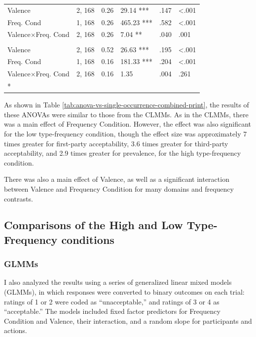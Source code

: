 \documentclass[
]{article}
\begin{document}
\begin{longtable}[t]{llllll}
\hspace{1em}Valence & 2, 168 & 0.26 & 29.14 *** & .147 & <.001\\
\hspace{1em}Freq. Cond & 1, 168 & 0.26 & 465.23 *** & .582 & <.001\\
Valence$\times$Freq.
\hspace{1em}Cond & 2, 168 & 0.26 & 7.04 ** & .040 & .001\\
\addlinespace[0.3em]
\multicolumn{6}{l}{\textbf{Prevalence - Low Type-Frequency (vs. Single Occurrence)}}\\
\hspace{1em}Valence & 2, 168 & 0.52 & 26.63 *** & .195 & <.001\\
\hspace{1em}Freq. Cond & 1, 168 & 0.16 & 181.33 *** & .204 & <.001\\
Valence$\times$Freq.
\hspace{1em}Cond & 2, 168 & 0.16 & 1.35 & .004 & .261\\*
\end{longtable}

As shown in Table \ref{tab:anova-vs-single-occurrence-combined-print}, the results of these ANOVAs were similar to those from the CLMMs. As in the CLMMs, there was a main effect of Frequency Condition. However, the effect was also significant for the low type-frequency condition, though the effect size was approximately 7 times greater for first-party acceptability, 3.6 times greater for third-party acceptability, and 2.9 times greater for prevalence, for the high type-frequency condition.

There was also a main effect of Valence, as well as a significant interaction between Valence and Frequency Condition for many domains and frequency contrasts.

\subsection{Comparisons of the High and Low Type-Frequency conditions}\label{comparisons-of-the-high-and-low-type-frequency-conditions-5}

\subsubsection{GLMMs}\label{glmms-3}

I also analyzed the results using a series of generalized linear mixed models (GLMMs), in which responses were converted to binary outcomes on each trial: ratings of 1 or 2 were coded as ``unacceptable,'' and ratings of 3 or 4 as ``acceptable.'' The models included fixed factor predictors for Frequency Condition and Valence, their interaction, and a random slope for participants and actions.
\end{document}
